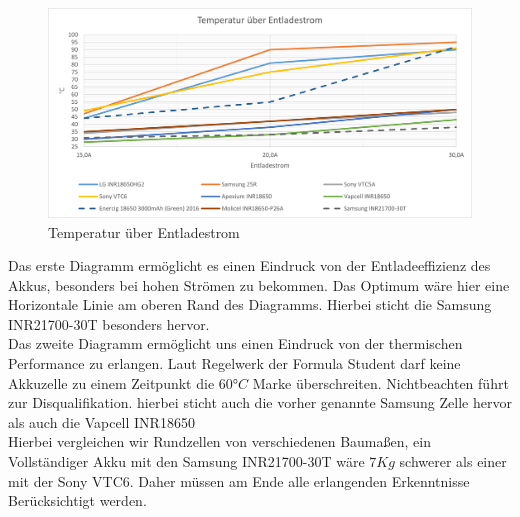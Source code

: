 \begin{figure}[h]
	\centering
	\includegraphics[width=0.6\linewidth]{bilder/Temperatur_ueber_Entladestrom}
	\caption{Temperatur über Entladestrom}
	\label{fig:Temperatur_ueber_Entladestrom}
\end{figure}

Das erste Diagramm ermöglicht es einen Eindruck von der Entladeeffizienz des Akkus, besonders bei hohen Strömen zu bekommen. Das Optimum wäre hier eine Horizontale Linie am oberen Rand des Diagramms. Hierbei sticht die Samsung INR21700-30T besonders hervor.\\
Das zweite Diagramm ermöglicht uns einen Eindruck von der thermischen Performance zu erlangen. Laut Regelwerk der Formula Student darf keine Akkuzelle zu einem Zeitpunkt die \ensuremath{60°C} Marke überschreiten. Nichtbeachten führt zur Disqualifikation. hierbei sticht auch die vorher genannte Samsung Zelle hervor als auch die Vapcell INR18650\\
Hierbei vergleichen wir Rundzellen von verschiedenen Baumaßen, ein Vollständiger Akku mit den Samsung INR21700-30T wäre \ensuremath{7Kg} schwerer als einer mit der Sony VTC6. Daher müssen am Ende alle erlangenden Erkenntnisse Berücksichtigt werden.

\FloatBarrier
